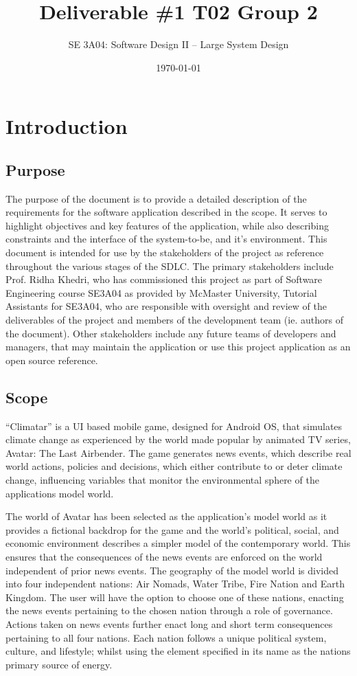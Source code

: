 \documentclass[]{article}
\title{Deliverable \#1 T02 Group 2}
\author{SE 3A04: Software Design II -- Large System Design}
\date{\today}
\begin{document}
\maketitle

\section{Introduction}
\label{sec:introduction}
\subsection{Purpose}
\label{sub:purpose}
	The purpose of the document is to provide a detailed description of the requirements for the software application described in the scope. It serves to highlight objectives and key features of the application, while also describing constraints and the interface of the system-to-be, and it's environment. This document is intended for use by the stakeholders of the project as reference throughout the various stages of the SDLC. The primary stakeholders include Prof. Ridha Khedri, who has commissioned this project as part of Software Engineering course SE3A04 as provided by McMaster University, Tutorial Assistants for SE3A04, who are responsible with oversight and review of the deliverables of the project and members of the development team (ie. authors of the document). Other stakeholders include any future teams of developers and managers, that may maintain the application or use this project application as an open source reference.

\subsection{Scope}
\label{sub:scope}
	“Climatar” is a UI based mobile game, designed for Android OS, that simulates climate change as experienced by the world made popular by animated TV series, Avatar: The Last Airbender. The game generates news events, which describe real world actions, policies and decisions, which either contribute to or deter climate change, influencing variables that monitor the environmental sphere of the applications model world. 

The world of Avatar has been selected as the application's model world as it provides a fictional backdrop for the game and the world's political, social, and economic environment describes a simpler model of the contemporary world. This ensures that the consequences of the news events are enforced on the world independent of prior news events. \cite{WoA}The geography of the model world is divided into four independent nations: Air Nomads, Water Tribe, Fire Nation and Earth Kingdom. The user will have the option to choose one of these nations, enacting the news events pertaining to the chosen nation through a role of governance. Actions taken on news events further enact long and short term consequences pertaining to all four nations. Each nation follows a unique political system, culture, and lifestyle; whilst using the element specified in its name as the nations primary source of energy.
\end{document}
